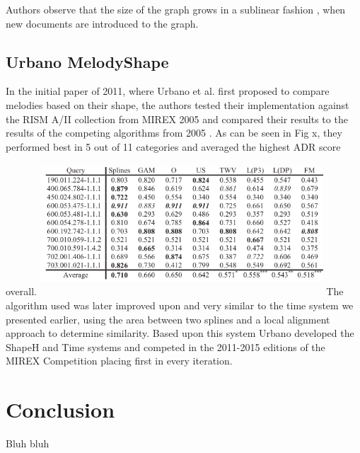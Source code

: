 \documentclass{llncs}
\begin{document}
			Authors observe that the size of the graph grows in a sublinear fashion , when new documents are introduced to the graph.   

\subsection{Urbano MelodyShape}
            In the initial paper of 2011, where Urbano et al. first proposed to compare melodies based on their shape, the authors tested their implementation against the RISM A/II collection from MIREX 2005 and compared their results to the results of the competing algorithms from 2005 \cite{five_point_five}. As can be seen in Fig x, they performed best in 5 out of 11 categories and averaged the highest ADR score overall. 
            \includegraphics[width=400px,height=200px,keepaspectratio]{one_of_five_point_five}
            The algorithm used was later improved upon and very similar to the time system we presented earlier, using the area between two splines and a local alignment approach to determine similarity. Based upon this system Urbano developed the ShapeH and Time systems  and competed in the 2011-2015 editions of the MIREX Competition placing first in every iteration. 


	\section{Conclusion}
		Bluh bluh
		
	
\end{document}
